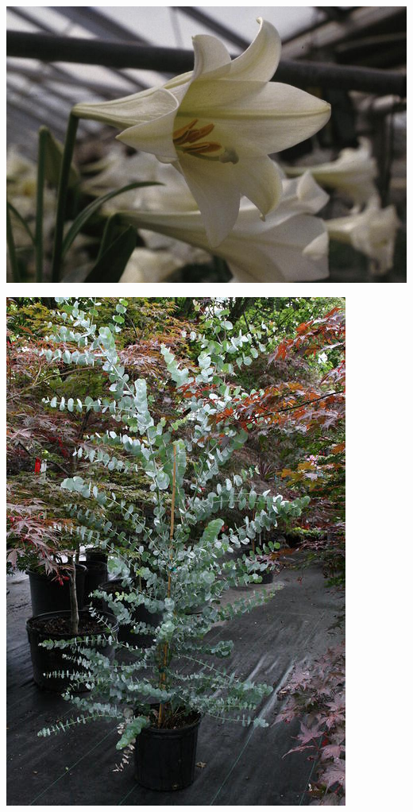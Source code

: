\documentclass{article}
\begin{document}
\begin{center}
\includegraphics[height=0.9\textheight, angle=90]{../EasterLily_trumpet.jpg}
\end{center}
\newpage

\begin{center}
\includegraphics[height=0.9\textheight, angle=90]{../Eucalyptus-pot.jpg}
\end{center}
\newpage
\end{document}
